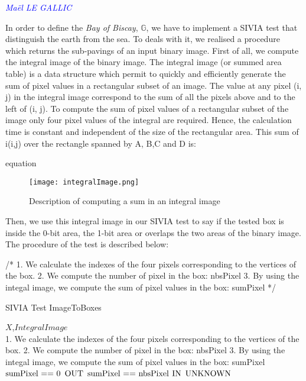 \vspace{0.5 cm}
\textcolor{blue} {\textit{Maël LE GALLIC}}
\vspace{0.3 cm}

In order to define the \emph{Bay of Biscay}, $\mathbb{G}$, we have to implement a SIVIA test that distinguish the earth from the sea. To deals with it, we realised a procedure which returns the sub-pavings of an input binary image. 
First of all, we compute the integral image of the binary image. The integral image (or summed area table) is a data structure which permit to quickly and efficiently generate the sum of pixel values in a rectangular subset of an image. The value at any pixel (i, j) in the integral image correspond to the sum of all the pixels above and to the left of (i, j). To compute the sum of pixel values of a rectangular subset of the image only four pixel values of the integral are required. Hence, the calculation time is constant and independent of the size of the rectangular area. This sum of i(i,j) over the rectangle spanned by A, B,C and D is:

equation

\begin{figure}[!h] 
\center
\texttt{[image: integralImage.png]} 
\caption{Description of computing a sum in an integral image } 
\label{fig: Integral image}
\end{figure}

Then, we use this integral image in our SIVIA test to say if the tested box is inside the 0-bit area, the 1-bit area or overlaps the two areas of the binary image. The procedure of the test is described below:

/* 1. We calculate the indexes of the four pixels corresponding to the vertices of the box.
2. We compute the number of pixel in the box: nbsPixel
3. By using the integal image, we compute the sum of pixel values in the box: sumPixel */

\begin{algorithm}[H]
\caption{SIVIA Test ImageToBoxes}
\label{alg:one_boat_alg}
\begin{algorithmic}[1]
\REQUIRE $X$,$IntegralImage$\\
1. We calculate the indexes of the four pixels corresponding to the vertices of the box.
2. We compute the number of pixel in the box: nbsPixel
3. By using the integal image, we compute the sum of pixel values in the box: sumPixel
\IF $\textnormal{sumPixel == 0}$ 
\RETURN $\textnormal{OUT}$
\ELSIF $\textnormal{sumPixel == nbsPixel}$ 
\RETURN $\textnormal{IN}$
\ELSE
\RETURN $\textnormal{UNKNOWN}$
\ENDIF
\end{algorithmic}
\end{algorithm}

